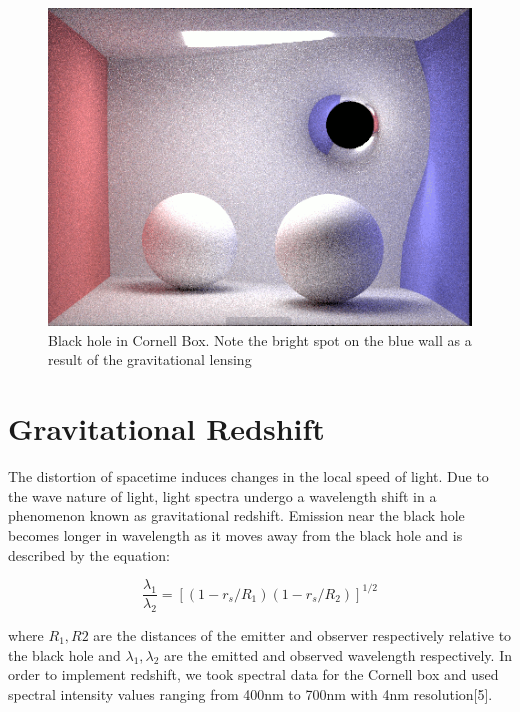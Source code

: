 \documentclass[sigconf]{acmart}
\begin{document}
\begin{figure}[h]
  \centering
  \includegraphics[width=\linewidth]{lense.png}
  \caption{Black hole in Cornell Box. Note the bright spot on the blue wall as a result of the gravitational lensing}
\end{figure}

\section{Gravitational Redshift}

The distortion of spacetime induces changes in the local speed of light. Due to the wave nature of light, light spectra undergo a wavelength shift in a phenomenon known as gravitational redshift. Emission near the black hole becomes longer in wavelength as it moves away from the black hole and is described by the equation:

\begin{displaymath}
  \frac{\lambda_1}{\lambda_2} = [(1 - r_s / R_1)(1 - r_s/R_2)]^{1/2}
\end{displaymath}

where $R_1, R2$ are the distances of the emitter and observer respectively relative to the black hole and $\lambda_1, \lambda_2$ are the emitted and observed wavelength respectively. In order to implement redshift, we took spectral data for the Cornell box and used spectral intensity values ranging from 400nm to 700nm with 4nm resolution[5].
\end{document}
